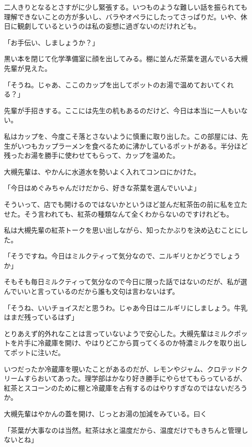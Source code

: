 \documentclass[a4paper,dvipdfmx,12pt]{jsarticle}
\begin{document}
\vspace{0.2in}

二人きりとなるとさすがに少し緊張する。いつものような難しい話を振られても理解できないことの方が多いし、バラやオペラにしたってさっぱりだ。いや、休日に観劇しているというのは私の妄想に過ぎないのだけれども。

「お手伝い、しましょうか？」

黒い本を閉じて化学準備室に顔を出してみる。棚に並んだ茶葉を選んでいる大槻先輩が見えた。

「そうね。じゃあ、ここのカップを出してポットのお湯で温めておいてくれる？」

先輩が手招きする。ここには先生の机もあるのだけど、今日は本当に一人もいない。

私はカップを、今度こそ落とさないように慎重に取り出した。この部屋には、先生がいつもカップラーメンを食べるために沸かしているポットがある。半分ほど残ったお湯を勝手に使わせてもらって、カップを温めた。

大槻先輩は、やかんに水道水を勢いよく入れてコンロにかけた。

「今日はめぐみちゃんだけだから、好きな茶葉を選んでいいよ」

そういって、店でも開けるのではないかというほど並んだ紅茶缶の前に私を立たせた。そう言われても、紅茶の種類なんて全くわからないのですけれども。

私は大槻先輩の紅茶トークを思い出しながら、知ったかぶりを決め込むことにした。

「そうですね。今日はミルクティって気分なので、ニルギリとかどうでしょうか」

そもそも毎日ミルクティって気分なので今日に限った話ではないのだが、私が選んでいいと言っているのだから誰も文句は言わないはず。

「そうね、いいチョイスだと思うわ。じゃあ今日はニルギリにしましょう。牛乳はまだ残っているはず」

とりあえず的外れなことは言っていないようで安心した。大槻先輩はミルクポットを片手に冷蔵庫を開け、やはりどこから買ってくるのか特濃ミルクを取り出してポットに注いだ。

いつだったか冷蔵庫を覗いたことがあるのだが、レモンやジャム、クロテッドクリームすらおいてあった。理学部はかなり好き勝手にやらせてもらっているが、紅茶とスコーンのために棚と冷蔵庫を占有するのはやりすぎなのではないだろうか。

大槻先輩はやかんの蓋を開け、じっとお湯の加減をみている。曰く

「茶葉が大事なのは当然。紅茶は水と温度だから、温度だけでもきちんと管理しないとね」
\end{document}
